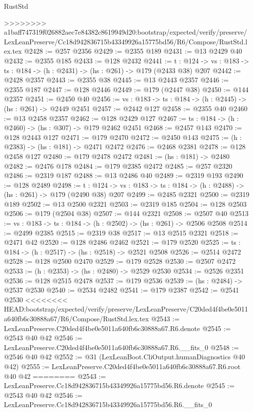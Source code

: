 \begin{lexlean}{RustStd}
\begin{coremodule}
{\begin{coremodule}
{{{{{>>>>>>>> a1baff747319f026882aec7e84382c8619949d20:bootstrap/expected/verify/preserve/LexLeanPreserve/Cc18d942836715b43349926a15775bd56/R6/Compose/RustStd.lex.tex
@2428 := @257 @2356
@2429 := @2355 @189
@2431 := @13 @2429 @40
@2432 := @2355 @185
@2433 := @128 @2432
@2441 := {t : @124} ->
  {vs : @183} -> {ts : @184} -> (h : @2431) -> (hs : @261) -> @179 (@2433 @38) @207
@2442 := @2428 @2357
@2443 := @2355 @38
@2445 := @13 @2443 @2357
@2446 := @2355 @187
@2447 := @128 @2446
@2449 := @179 (@2447 @38)
@2450 := @144 @2357
@2451 := @2450 @40
@2456 := {vs : @183} -> {ts : @184} -> (h : @2445) -> (hs : @261) -> @2449 @2451
@2457 := @2442 @127
@2458 := @2355 @40
@2460 := @13 @2458 @2357
@2462 := @128 @2429 @127
@2467 := {ts : @184} -> (h : @2460) -> (hs : @307) -> @179 @2462 @2451
@2468 := @2457 @143
@2470 := @128 @2443 @127
@2471 := @179 @2470
@2472 := @2450 @143
@2475 := (h : @2383) -> (hs : @181) -> @2471 @2472
@2476 := @2468 @2381
@2478 := @128 @2458 @127
@2480 := @179 @2478 @2472
@2481 := (hs : @181) -> @2480
@2482 := @2476 @178
@2484 := @179 @2385 @2472
@2485 := @257 @2320
@2486 := @2319 @187
@2488 := @13 @2486 @40
@2489 := @2319 @193
@2490 := @128 @2489
@2498 := {t : @124} ->
  {vs : @183} -> {ts : @184} -> (h : @2488) -> (hs : @261) -> @179 (@2490 @38) @207
@2499 := @2485 @2321
@2500 := @2319 @189
@2502 := @13 @2500 @2321
@2503 := @2319 @185
@2504 := @128 @2503
@2506 := @179 (@2504 @38)
@2507 := @144 @2321
@2508 := @2507 @40
@2513 := {vs : @183} -> {ts : @184} -> (h : @2502) -> (hs : @261) -> @2506 @2508
@2514 := @2499 @2385
@2515 := @2319 @38
@2517 := @13 @2515 @2321
@2518 := @2471 @42
@2520 := @128 @2486 @2462
@2521 := @179 @2520
@2525 := {ts : @184} -> (h : @2517) -> (hs : @2518) -> @2521 @2508
@2526 := @2514 @2472
@2528 := @128 @2500 @2470
@2529 := @179 @2528
@2530 := @2507 @2472
@2533 := (h : @2353) -> (hs : @2480) -> @2529 @2530
@2534 := @2526 @2351
@2536 := @128 @2515 @2478
@2537 := @179 @2536
@2539 := (hs : @2484) -> @2537 @2530
@2540 := @2534 @2482
@2541 := @179 @2387
@2542 := @2541 @2530
<<<<<<<< HEAD:bootstrap/expected/verify/preserve/LexLeanPreserve/C20ded4f4be0e5011a640fb6c30888a67/R6/Compose/RustStd.lex.tex
@2543 := LexLeanPreserve.C20ded4f4be0e5011a640fb6c30888a67.R6.denote
@2545 := @2543 @40 @42
@2546 := LexLeanPreserve.C20ded4f4be0e5011a640fb6c30888a67.R6.__fits_0
@2548 := @2546 @40 @42
@2552 := @31 (LexLeanBoot.CliOutput.humanDiagnostics @40 @42)
@2555 := LexLeanPreserve.C20ded4f4be0e5011a640fb6c30888a67.R6.root @40 @42
========
@2543 := LexLeanPreserve.Cc18d942836715b43349926a15775bd56.R6.denote
@2545 := @2543 @40 @42
@2546 := LexLeanPreserve.Cc18d942836715b43349926a15775bd56.R6.__fits_0
}}}}}
\end{coremodule}}
\end{coremodule}
\end{lexlean}
